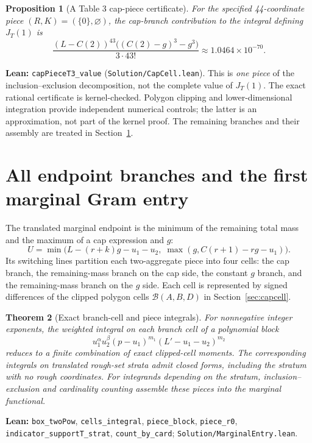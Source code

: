 \documentclass[11pt]{article}
\newtheorem{theorem}{Theorem}[section]
\newtheorem{proposition}[theorem]{Proposition}
\newcommand{\code}[1]{\texttt{#1}}
\begin{document}
\begin{proposition}[A Table 3 cap-piece certificate]\label{prop:capcert}
For the specified 44-coordinate piece $(R,K)=(\{0\},\varnothing)$,
the cap-branch contribution to the integral defining $J_T(1)$ is
\[
 \frac{(L-C(2))^{43}\big((C(2)-g)^3-g^3\big)}{3\cdot43!}
 \approx 1.0464\times 10^{-70}.
\]
\end{proposition}
\noindent\textbf{Lean:} \code{capPieceT3\_value}
(\nolinkurl{Solution/CapCell.lean}). This is \emph{one piece} of the
inclusion--exclusion decomposition, not the complete value of $J_T(1)$.
The exact rational certificate is kernel-checked. Polygon clipping and
lower-dimensional integration provide independent numerical controls;
the latter is an approximation, not part of the kernel proof.
The remaining branches and their assembly are treated in Section~\ref{sec:v2f}.

\section{All endpoint branches and the first marginal Gram entry}\label{sec:v2f}
The translated marginal endpoint is the minimum of the remaining total mass
and the maximum of a cap expression and $g$:
\[
 U=\min\bigl(L-(r+k)g-u_1-u_2,\;
       \max(g,C(r+1)-rg-u_1)\bigr).
\]
Its switching lines partition each two-aggregate piece into four cells:
the cap branch, the remaining-mass branch on the cap side, the constant
$g$ branch, and the remaining-mass branch on the $g$ side. Each cell
is represented by signed differences of the clipped polygon cells
$\mathcal B(A,B,D)$ in Section~\ref{sec:capcell}.

\begin{theorem}[Exact branch-cell and piece integrals]\label{thm:allbranches}
For nonnegative integer exponents, the weighted integral on each branch cell
of a polynomial block
\[
 u_1^\alpha u_2^\beta (p-u_1)^{m_1}
 (L'-u_1-u_2)^{m_2}
\]
reduces to a finite combination of exact clipped-cell moments. The
corresponding integrals on translated rough-set strata admit closed forms,
including the stratum with no rough coordinates. For integrands depending
on the stratum, inclusion--exclusion and cardinality counting assemble
these pieces into the marginal functional.
\end{theorem}
\noindent\textbf{Lean:} \code{box\_twoPow}, \code{cells\_integral},
\code{piece\_block}, \code{piece\_r0},
\code{indicator\_supportT\_strat}, \code{count\_by\_card};
\nolinkurl{Solution/MarginalEntry.lean}.
\end{document}
